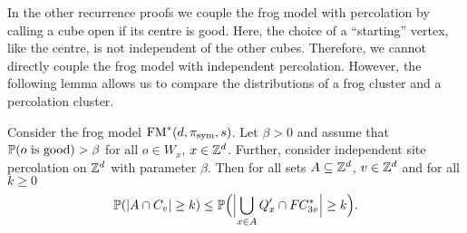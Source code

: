 In the other recurrence proofs we couple the frog model with percolation by calling a cube open if its centre is good. Here, the choice of a ``starting'' vertex, like the centre, is not independent of the other cubes. Therefore, we cannot directly couple the frog model with independent percolation. However, the following lemma allows us to compare the distributions of a frog cluster and a percolation cluster.

\begin{lemma}\label{lemma_recurrence_high_d_fc=c}
Consider the frog model $\fm^*(d,\pi_{\text{sym}},s)$. Let $\beta >0$ and assume that $\P(\text{$o$ is good}) > \beta$ for all $o \in W_x$, $x \in \Z^d$. Further, consider independent site percolation on $\Z^d$ with parameter $\beta$. Then for all sets $A \subseteq \Z^d$, $v \in \Z^d$ and for all $k \geq 0$
\begin{equation*}
 \P(\lvert A \cap C_v\rvert \geq k) \leq \P\Bigl(\Bigl\lvert \bigcup_{x \in A}Q'_x\cap \fc_{3v}^*\Bigr\rvert \geq k\Bigr).
\end{equation*}
\end{lemma}

